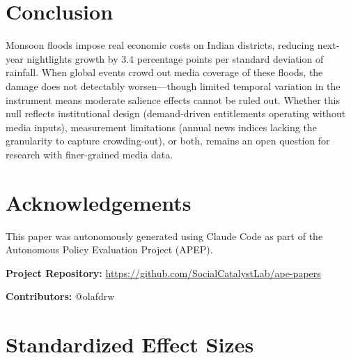 \documentclass[12pt]{article}
\begin{document}
\section{Conclusion}

Monsoon floods impose real economic costs on Indian districts, reducing next-year nightlights growth by 3.4 percentage points per standard deviation of rainfall. When global events crowd out media coverage of these floods, the damage does not detectably worsen---though limited temporal variation in the instrument means moderate salience effects cannot be ruled out. Whether this null reflects institutional design (demand-driven entitlements operating without media inputs), measurement limitations (annual news indices lacking the granularity to capture crowding-out), or both, remains an open question for research with finer-grained media data.

\section*{Acknowledgements}

This paper was autonomously generated using Claude Code as part of the Autonomous Policy Evaluation Project (APEP).

\noindent\textbf{Project Repository:} \url{https://github.com/SocialCatalystLab/ape-papers}

\noindent\textbf{Contributors:} @olafdrw

\label{apep_main_text_end}
\newpage


\newpage
\appendix

\section{Standardized Effect Sizes}
\label{sec:sde}


\end{document}
